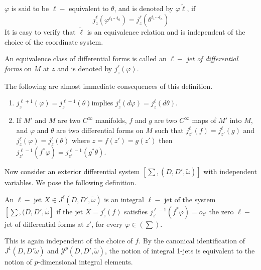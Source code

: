 \begin{defi*}%
  $\varphi$ is said to be $\ell -$ equivalent to $\theta$, and is
  denoted by $\varphi \tilde{\ell}$, if 
  $$
  j^{\ell}_z \left(\varphi ^{i_1 \cdots i_a}\right) = j^{\ell}_z
  \left(\theta ^{i_1 \cdots i_a}\right) 
  $$
  It is easy to verify that $\tilde{\ell}$ is an equivalence relation and is
  independent of the choice of the coordinate system. 
\end{defi*}

\begin{defi*}%
  An equivalence class of differential forms is called an $\ell-$ {\em
    jet of differential forms } on $M$ at $z$ and is denoted by
  $j^{\ell}_z (\varphi)$.  
\end{defi*}

The following are almost immediate consequences of this definition.
\begin{enumerate}[(1)]
\item $j^{\ell + 1}_z (\varphi) = j^{\ell + 1}_z (\theta)$\pageoriginale implies
  $j^{\ell}_z ( d \varphi) = j^{\ell}_z (d \theta)$. 
\item If $M'$ and $M$ are two $C^\infty$ manifolds, $f$ and $g$ are
  two $C^\infty$ maps of $M'$ into $M$, and $\varphi$ and $\theta$ are
  two differential forms on $M$ such that $ j^\ell_{z'}(f) =
  j^{\ell}_{z'} (g)$ and $j^{\ell}_z (\varphi) = j^{\ell}_z (\theta)$
  where $z = f(z') = g(z')$ then $j^{\ell - 1}_{z'} (f^* \varphi) =
  j^{\ell -1}_{z'} (g^* \theta)$. 
\end{enumerate}

Now consider an exterior differential system $[\sum , (D, D',
  \tilde{\omega})]$ with independent variables. We pose the following
definition. 

\begin{defi*}%
  An $\ell -$ jet $X \in J^\ell (D, D', \tilde{\omega})$ is an
  integral $\ell -$ jet of the system $[ \sum , (D, D',
    \tilde{\omega}]$ if the jet $X = j^{\ell}_z (f)$ satisfies
  $j^{\ell - 1}_{z'} (f^* \varphi) = o_{z'}$ the zero $\ell -$ jet of
  differential forms at $z'$, for every $\varphi \in (\sum)$. 
\end{defi*}

This is again independent of the choice of $f$. By the canonical
identification of $J^1 (D, D' \tilde{\omega})$ and $\mathscr{Y}^p (D,
D', \tilde{\omega})$, the notion of integral 1-jets is equivalent to
the notion of $p$-dimensional integral elements. 


